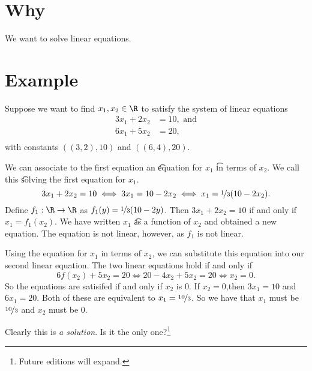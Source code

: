 

\section*{Why}

We want to solve linear equations.

\section*{Example}

Suppose we want to find $x_1, x_2 \in \R $ to satisfy the system of linear equations
\[
\begin{aligned}
3x_1 + 2x_2 &= 10, \text{ and} \\
6x_1 + 5x_2 &= 20, \\
\end{aligned}
\]
with constants $((3, 2), 10)$ and $((6, 4), 20)$.

We can associate to the first equation an \t{equation for} $x_1$ \t{in terms of} $x_2$.
We call this \t{solving the first equation for $x_1$}.
\[
3x_1 + 2x_2 = 10 \iff 3x_1 = 10 - 2x_2 \iff x_1 = \nicefrac{1}{3}(10 - 2x_2).
\]
Define $f_1: \R  \to \R $ as $f_1(y) = \nicefrac{1}{3}(10 - 2y)$.
Then $3x_1 + 2x_2 = 10$ if and only if $x_1 = f_1(x_2)$.
We have written $x_1$ \t{as a function} of $x_2$ and obtained a new equation.
The equation is not linear, however, as $f_1$ is not linear.

Using the equation for $x_1$ in terms of $x_2$, we can substitute this equation into our second linear equation.
The two linear equations hold if and only if
\[
6f(x_2) + 5x_2 = 20 \iff 20 - 4x_2 + 5x_2 = 20 \iff x_2 = 0.
\]
So the equations are satisifed if and only if $x_2$ is $0$.
If $x_2 = 0$,then $3x_1 = 10$ and $6x_1 = 20$.
Both of these are equivalent to $x_1 = \nicefrac{10}{3}$.
So we have that $x_1$ must be $\nicefrac{10}{3}$ and $x_2$ must be 0.

Clearly this is \textit{a solution}.
Is it the only one?\footnote{Future editions will expand.}

\blankpage
